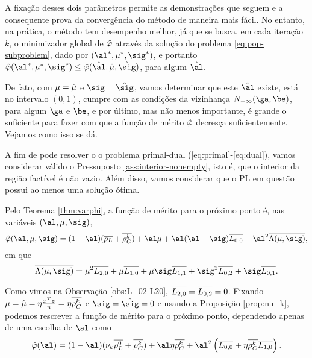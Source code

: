  A fixação desses dois parâmetros permite as demonstrações que seguem e a consequente prova da convergência do método de maneira mais fácil. No entanto, na prática, o método  tem desempenho melhor, já que se busca, em cada iteração $k$,
o minimizador global de $\hat{\varphi}$ através da solução do problema \eqref{eq:pop-subproblem}, dado por $(\al^*,\mu^*,\sig^*)$, e portanto	$\nextphi(\al^*,\mu^*,\sig^*)\leq \nextphi(\hat{\al},\nextmu,\nextsig)$, para algum   $\hat{\al}$.

De fato, com $\mu=\hat{\mu}$ e $\sig=\nextsig$, vamos determinar que este $\nextal$ existe, está no intervalo $(0,1)$, cumpre com as condições da vizinhança $N_{-\infty}(\ga,\be)$, para algum $\ga$ e $\be$, e por último, mas não menos importante, é grande o suficiente para fazer com que a função de mérito $\hat{\varphi}$ decresça suficientemente. Vejamos como isso se dá.




A fim de pode  resolver o o problema primal-dual (\ref{eq:primal}-\ref{eq:dual}), vamos considerar válido o Pressuposto \ref{ass:interior-nonempty}, isto é, que o interior da região factível é não vazio. Além disso, vamos considerar que o \ac{PL} em questão possui ao menos uma solução ótima. 





Pelo Teorema \ref{thm:varphi}, a função de mérito para o próximo ponto   é, nas variáveis  $(\al,\mu,\sig)$,
\begin{equation*}
{\nextphi}(\al,\mu,\sig) =  (1-\al)(\dbvec{\rho_L} +
\rhoCkb ) + \al\mu + \al(\al-\sig)\dbvec{L_{0,0}} +
\al^2\dbvec{\Lambda(\mu,\sig)} ,
\end{equation*}
em que 
\[
\dbvec{\Lambda(\mu,\sig)} = \mu^2
 \dbvec{L_{2,0}} + \mu \dbvec{L_{1,0}} + 	\mu \sig \dbvec{L_{1,1}} +
 \sig^2 \dbvec{L_{0,2}} + \sig \dbvec{L_{0,1}}.
 \]


Como vimos na Observação \ref{obs:L_02-L20},  $\overline{L_{2,0}} = \overline{L_{0,2}} = 0$. Fixando $\mu = \hat{\mu} = \eta\frac{x^Tz}{n} = \eta\overline{\rho_C^{k}}  $
 e $\sig = \nextsig=0$ e usando a Proposição \ref{prop:nu_k},   podemos rescrever a função de mérito para o próximo ponto, dependendo apenas de uma escolha de  $\al$ como
\begin{equation}
	\label{eq:simplified-merit-function-al}
\nextphi(\al)  = (1-\al)(\nuk \dbvec{\rho_L^{0}} +
\rhoCkb ) + \al\eta\rhoCkb  + \al^2\left(\dbvec{L_{0,0}} + \eta\rhoCkb  \dbvec{L_{1,0}}
\right) .
\end{equation}

